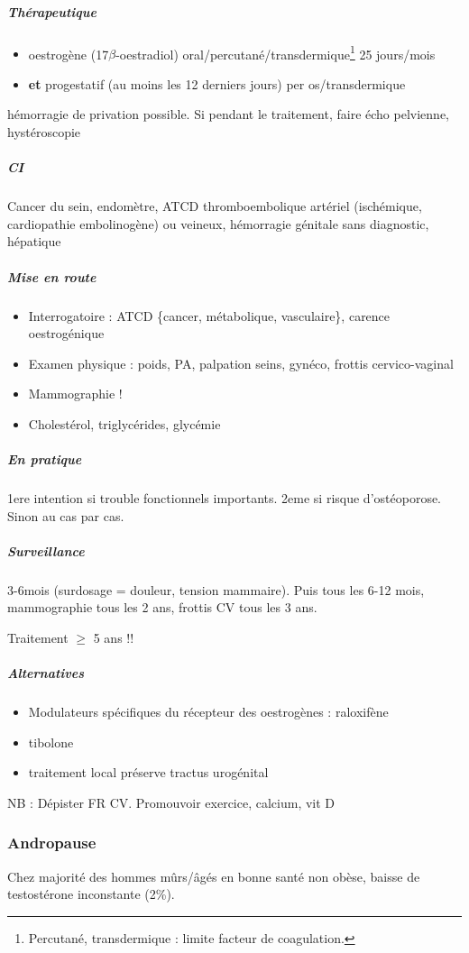 \documentclass[11pt]{article}
\begin{document}
\subparagraph{Thérapeutique}
\label{sec:org66a30dd}
\begin{itemize}
\item oestrogène (17\(\beta\)-oestradiol) oral/percutané/transdermique\footnote{Percutané, transdermique : limite \inc facteur de coagulation.} 25 jours/mois
\item \textbf{et} progestatif (au moins les 12 derniers jours) per os/transdermique
\end{itemize}
\danger hémorragie de privation possible. Si pendant le traitement, faire écho
pelvienne, hystéroscopie

\subparagraph{CI}
\label{sec:org0c9f44d}
Cancer du sein, endomètre, ATCD thromboembolique artériel (ischémique,
cardiopathie embolinogène) ou veineux, hémorragie génitale sans diagnostic, hépatique

\subparagraph{Mise en route}
\label{sec:org3e290d9}
\begin{itemize}
\item Interrogatoire : ATCD \{cancer, métabolique, vasculaire\}, carence oestrogénique
\item Examen physique : poids, PA, palpation seins, gynéco, frottis cervico-vaginal
\item Mammographie !
\item Cholestérol, triglycérides, glycémie
\end{itemize}

\subparagraph{En pratique}
\label{sec:orgc8a72ca}
1ere intention si trouble fonctionnels importants. 2eme si risque
d'ostéoporose. Sinon au cas par cas.

\subparagraph{Surveillance}
\label{sec:org80512ac}
3-6mois (surdosage = douleur, tension mammaire). Puis tous les 6-12 mois,
mammographie tous les 2 ans, frottis CV tous les 3 ans.

Traitement \(\ge\) 5 ans !!

\subparagraph{Alternatives}
\label{sec:orgef144d3}
\begin{itemize}
\item Modulateurs spécifiques du récepteur des oestrogènes : raloxifène
\item tibolone
\item traitement local préserve tractus urogénital
\end{itemize}

NB : Dépister FR CV. Promouvoir exercice, calcium, vit D

\subsubsection{Andropause}
\label{sec:orge615047}
Chez majorité des hommes mûrs/âgés en bonne santé non obèse, baisse de
testostérone inconstante (2\%).
\end{document}
